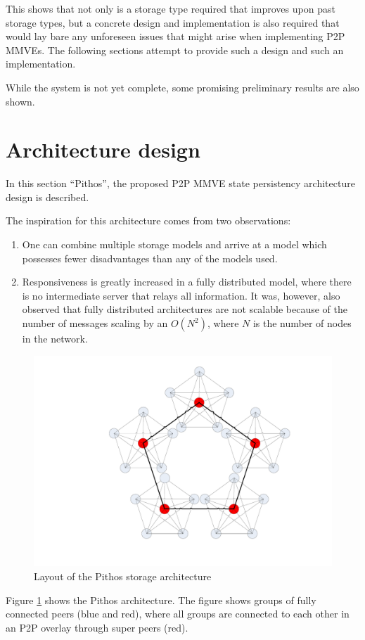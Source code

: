 \documentclass[10pt,a4paper,conference]{IEEEtran}
\begin{document}
This shows that not only is a storage type required that improves upon past storage types, but a concrete design and implementation is also required
that would lay bare any unforeseen issues that might arise when implementing P2P MMVEs. The following sections attempt to provide such a design and
such an implementation.

While the system is not yet complete, some promising preliminary results are also shown.

\section{Architecture design}
\label{proposed_model}

In this section ``Pithos'', the proposed P2P MMVE state persistency architecture design is described.

The inspiration for this architecture comes from two observations:
\begin{enumerate}
  \item One can combine multiple storage models and arrive at a model which possesses fewer disadvantages than any of the models used.
  \item Responsiveness is greatly increased in a fully distributed model, where there is no intermediate server that relays all information. It
      was, however, also observed that fully distributed architectures are not scalable because of the number of messages scaling by an $O(N^2)$,
      where $N$ is the number of nodes in the network.
\end{enumerate}

\begin{figure}[htbp]
 \centering
 \includegraphics[clip=true, viewport=7.5cm 2.5cm 26cm 20cm, width=0.7\columnwidth]{CDHT_layout}
 \caption{Layout of the Pithos storage architecture}
 \label{fig_pithos}
\end{figure}
%
Figure \ref{fig_pithos} shows the Pithos architecture. The figure shows groups of fully connected peers (blue and red), where all groups are
connected to each other in an P2P overlay through super peers (red).
\end{document}
